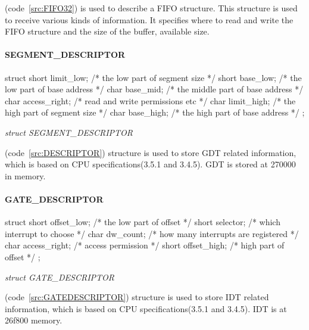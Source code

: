 \documentclass{swfcthesis}
\begin{document}
(code~\ref{src:FIFO32}) is used to
describe a FIFO structure. This structure is used to receive various kinds of
information. It specifies where to read and write the FIFO structure and the size of the
buffer, available size.


\paragraph{SEGMENT\_DESCRIPTOR}

\begin{listing}[H]
  \begin{codeblock}
\begin{ccode}
struct 
{ 
  short limit_low;   /* the low part of segment size */
  short base_low;    /* the low part of base address */
  char base_mid;     /* the middle part of base address */
  char access_right; /* read and write permissions etc */
  char  limit_high;  /* the high part of segment size */
  char base_high;    /* the high part of base address */
};
\end{ccode}
  \end{codeblock}
  \caption{\emph{struct SEGMENT\_DESCRIPTOR}}\label{src:DESCRIPTOR}
\end{listing}

(code~\ref{src:DESCRIPTOR}) structure is
used to store GDT related information, which is based on CPU specifications(3.5.1 and
3.4.5\cite{intel_3a}). GDT is stored at 270000 in memory.


\paragraph{GATE\_DESCRIPTOR}

\begin{listing}[H]
  \begin{codeblock}
\begin{ccode}
struct 
{ 
  short offset_low;   /* the low part of offset */
  short selector;     /* which interrupt to choose */
  char dw_count;      /* how many interrupts are registered */
  char access_right;  /* access permission */
  short  offset_high; /* high part of offset */
};
\end{ccode}
  \end{codeblock}
  \caption{\emph{struct GATE\_DESCRIPTOR}}\label{src:GATEDESCRIPTOR}
\end{listing}

(code~\ref{src:GATEDESCRIPTOR}) structure is used to
store IDT related information, which is based on CPU specifications(3.5.1 and
3.4.5\cite{intel_3a}). IDT is at 26f800 memory.
\end{document}
